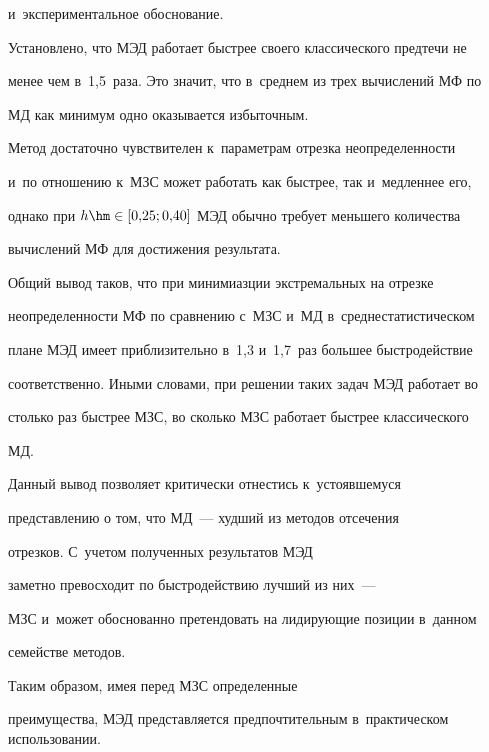 и~экспериментальное обоснование. 


  


  Установлено, что МЭД работает быстрее своего классического предтечи не 


менее чем в~1,5~раза. Это значит, что в~среднем из трех вычислений МФ по 


МД как минимум одно оказывается избыточным.


  


  Метод достаточно чувствителен к~параметрам отрезка неопределенности 


и~по отношению к~МЗС может работать как быстрее, так и~медленнее его, 


однако при $h \hm\in [0{,}25; 0{,}40]$ МЭД обычно требует меньшего количества 


вычислений МФ для достижения результата. 


  


  Общий вывод таков, что при минимиазции экстремальных на отрезке 


неопределенности МФ по сравнению с~МЗС и~МД в~среднестатистическом 


плане МЭД имеет приблизительно в~1,3 и~1,7~раз большее быстродействие 


соответственно. Иными словами, при решении таких задач МЭД работает во 


столько раз быстрее МЗС, во сколько МЗС работает быстрее классического 


МД. 


  


  Данный вывод позволяет критически отнестись к~устоявшемуся 


представлению о том, что МД~--- худший из методов отсечения 


отрезков. С~учетом полученных результатов МЭД


заметно превосходит по быстродействию лучший из них~--- 


МЗС и~может обоснованно претендовать на лидирующие позиции в~данном 


семействе методов.  


  


  Таким образом, имея перед МЗС определенные 


преимущества, МЭД представляется предпочтительным в~практическом использовании.      





